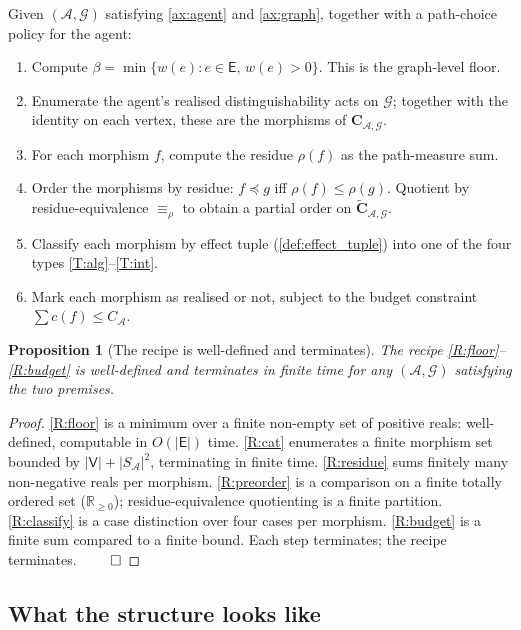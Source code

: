 \documentclass[11pt,twocolumn,a4paper]{article}
\theoremstyle{thmstyle}
\newtheorem{proposition}[theorem]{Proposition}
\theoremstyle{definition}
\theoremstyle{remark}
\newcommand{\R}{\mathbb{R}}
\newcommand{\Graph}{\mathcal{G}}
\newcommand{\Vrt}{\mathsf{V}}
\newcommand{\Edg}{\mathsf{E}}
\newcommand{\Agent}{\mathcal{A}}
\newcommand{\Res}{\rho}
\newcommand{\floor}{\beta}
\begin{document}
Given $(\Agent, \Graph)$ satisfying \cref{ax:agent} and
\cref{ax:graph}, together with a path-choice policy for the agent:
\begin{enumerate}[label=(R\arabic*),leftmargin=2.6em,nosep]
\item\label{R:floor} Compute $\floor = \min \{w(e) : e \in \Edg,\,
w(e) > 0\}$. This is the graph-level floor.
\item\label{R:cat} Enumerate the agent's realised
distinguishability acts on $\Graph$; together with the identity on
each vertex, these are the morphisms of
$\mathbf{C}_{\Agent,\Graph}$.
\item\label{R:residue} For each morphism $f$, compute the residue
$\Res(f)$ as the path-measure sum.
\item\label{R:preorder} Order the morphisms by residue:
$f \preceq g$ iff $\Res(f) \leq \Res(g)$. Quotient by
residue-equivalence $\equiv_\Res$ to obtain a partial order on
$\widetilde{\mathbf{C}}_{\Agent,\Graph}$.
\item\label{R:classify} Classify each morphism by effect tuple
(\cref{def:effect_tuple}) into one of the four types
\ref{T:alg}--\ref{T:int}.
\item\label{R:budget} Mark each morphism as realised or not,
subject to the budget constraint $\sum c(f) \leq C_\Agent$.
\end{enumerate}

\begin{proposition}[The recipe is well-defined and terminates]
\label{prop:recipe}
The recipe \ref{R:floor}--\ref{R:budget} is well-defined and
terminates in finite time for any $(\Agent, \Graph)$ satisfying
the two premises.
\end{proposition}

\begin{proof}
\ref{R:floor} is a minimum over a finite non-empty set of positive
reals: well-defined, computable in $O(|\Edg|)$ time.
\ref{R:cat} enumerates a finite morphism set bounded by
$|\Vrt| + |S_\Agent|^2$, terminating in finite time.
\ref{R:residue} sums finitely many non-negative reals per morphism.
\ref{R:preorder} is a comparison on a finite totally ordered set
($\R_{\geq 0}$); residue-equivalence quotienting is a finite
partition.
\ref{R:classify} is a case distinction over four cases per
morphism.
\ref{R:budget} is a finite sum compared to a finite bound.
Each step terminates; the recipe terminates. $\qed$
\end{proof}

\subsection{What the structure looks like}
\end{document}
